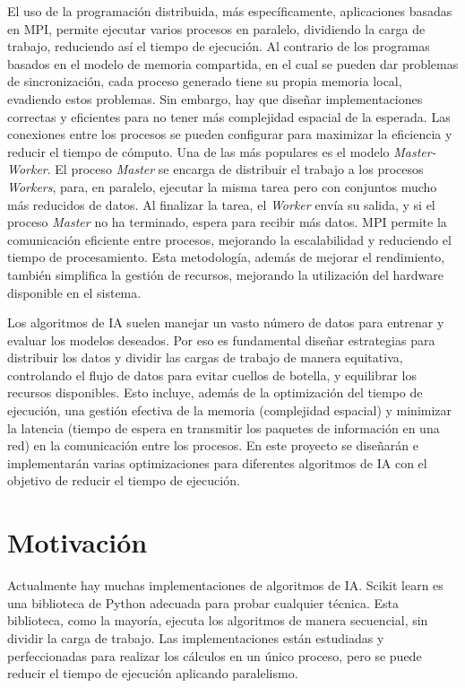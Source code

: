 	El uso de la programación distribuida, más específicamente, aplicaciones basadas en MPI, permite ejecutar varios procesos en paralelo, dividiendo la carga de trabajo, reduciendo así el tiempo de ejecución. Al contrario de los programas basados en el modelo de memoria compartida, en el cual se pueden dar problemas de sincronización, cada proceso generado tiene su propia memoria local, evadiendo estos problemas. Sin embargo, hay que diseñar implementaciones correctas y eficientes para no tener más complejidad espacial de la esperada. Las conexiones entre los procesos se pueden configurar para maximizar la eficiencia y reducir el tiempo de cómputo. Una de las más populares es el modelo \textit{Master-Worker}. El proceso \textit{Master} se encarga de distribuir el trabajo a los procesos \textit{Workers}, para, en paralelo, ejecutar la misma tarea pero con conjuntos mucho más reducidos de datos. Al finalizar la tarea, el \textit{Worker} envía su salida, y si el proceso \textit{Master} no ha terminado, espera para recibir más datos. MPI permite la comunicación eficiente entre procesos, mejorando la escalabilidad y reduciendo el tiempo de procesamiento. Esta metodología, además de mejorar el rendimiento, también simplifica la gestión de recursos, mejorando la utilización del hardware disponible en el sistema. 
	
	Los algoritmos de IA suelen manejar un vasto número de datos para entrenar y evaluar los modelos deseados. Por eso es fundamental diseñar estrategias para distribuir los datos y dividir las cargas de trabajo de manera equitativa, controlando el flujo de datos para evitar cuellos de botella, y equilibrar los recursos disponibles. Esto incluye, además de la optimización del tiempo de ejecución, una gestión efectiva de la memoria (complejidad espacial) y minimizar la latencia (tiempo de espera en transmitir los paquetes de información en una red) en la comunicación entre los procesos.
	En este proyecto se diseñarán e implementarán varias optimizaciones para diferentes algoritmos de IA con el objetivo de reducir el tiempo de ejecución.





\section{Motivación}
	Actualmente hay muchas implementaciones de algoritmos de IA. Scikit learn es una biblioteca de Python adecuada para probar cualquier técnica. Esta biblioteca, como la mayoría, ejecuta los algoritmos de manera secuencial, sin dividir la carga de trabajo.  Las implementaciones están estudiadas y perfeccionadas para realizar los cálculos en un único proceso, pero se puede reducir el tiempo de ejecución aplicando paralelismo. 
	
